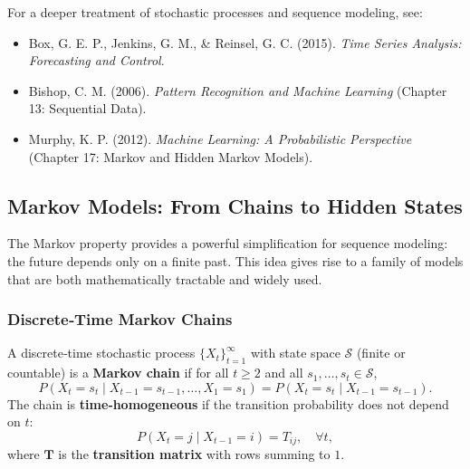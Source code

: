 \documentclass{tufte-handout}
\begin{document}
For a deeper treatment of stochastic processes and sequence modeling, see:
\begin{itemize}
    \item Box, G. E. P., Jenkins, G. M., \& Reinsel, G. C. (2015). \textit{Time Series Analysis: Forecasting and Control}.
    \item Bishop, C. M. (2006). \textit{Pattern Recognition and Machine Learning} (Chapter 13: Sequential Data).
    \item Murphy, K. P. (2012). \textit{Machine Learning: A Probabilistic Perspective} (Chapter 17: Markov and Hidden Markov Models).
\end{itemize}

\subsection{Markov Models: From Chains to Hidden States}

The Markov property provides a powerful simplification for sequence modeling: the future depends only on a finite past. This idea gives rise to a family of models that are both mathematically tractable and widely used.

\subsubsection{Discrete‑Time Markov Chains}

\begin{defn}
    A discrete‑time stochastic process $\{X_t\}_{t=1}^\infty$ with state space $\mathcal{S}$ (finite or countable) is a \textbf{Markov chain} if for all $t \ge 2$ and all $s_1,\dots,s_t \in \mathcal{S}$,
    \[
    P(X_t = s_t \mid X_{t-1}=s_{t-1}, \dots, X_1=s_1) = P(X_t = s_t \mid X_{t-1}=s_{t-1}).
    \]
    The chain is \textbf{time‑homogeneous} if the transition probability does not depend on $t$:
    \[
    P(X_t = j \mid X_{t-1}=i) = T_{ij}, \quad \forall t,
    \]
    where $\mathbf{T}$ is the \textbf{transition matrix} with rows summing to $1$.
\end{defn}

\begin{marginfigure}
\centering
{}
\caption{A three‑state Markov chain with transition probabilities.}
\end{marginfigure}
\end{document}
